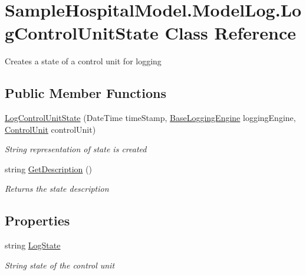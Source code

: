 \hypertarget{class_sample_hospital_model_1_1_model_log_1_1_log_control_unit_state}{}\section{Sample\+Hospital\+Model.\+Model\+Log.\+Log\+Control\+Unit\+State Class Reference}
\label{class_sample_hospital_model_1_1_model_log_1_1_log_control_unit_state}


Creates a state of a control unit for logging  


\subsection*{Public Member Functions}
\begin{DoxyCompactItemize}
\item 
\hyperlink{class_sample_hospital_model_1_1_model_log_1_1_log_control_unit_state_a09a99a70e6068af69f50ac9baa009b28}{Log\+Control\+Unit\+State} (Date\+Time time\+Stamp, \hyperlink{class_sample_hospital_model_1_1_model_log_1_1_base_logging_engine}{Base\+Logging\+Engine} logging\+Engine, \hyperlink{class_simulation_core_1_1_h_c_c_m_elements_1_1_control_unit}{Control\+Unit} control\+Unit)
\begin{DoxyCompactList}\small\item\em String representation of state is created \end{DoxyCompactList}\item 
string \hyperlink{class_sample_hospital_model_1_1_model_log_1_1_log_control_unit_state_a089c197e3af7e95bf9683b7917bbba91}{Get\+Description} ()
\begin{DoxyCompactList}\small\item\em Returns the state description \end{DoxyCompactList}\end{DoxyCompactItemize}
\subsection*{Properties}
\begin{DoxyCompactItemize}
\item 
string \hyperlink{class_sample_hospital_model_1_1_model_log_1_1_log_control_unit_state_abcf6bf8965025c76354dfd6c9f9d2f1b}{Log\+State}
\begin{DoxyCompactList}\small\item\em String state of the control unit \end{DoxyCompactList}\end{DoxyCompactItemize}


